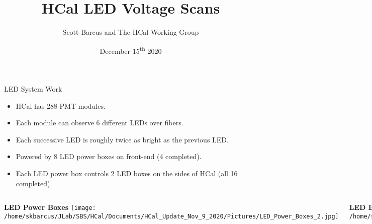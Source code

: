 \documentclass[10pt]{beamer}
\title{HCal LED Voltage Scans}
\subtitle{}
\date{December 15\textsuperscript{th} 2020}
\author{Scott Barcus and The HCal Working Group}
\institute{Jefferson Lab}
\begin{document}
\maketitle

\begin{frame}{LED System Work}

    \begin{itemize}
		\item HCal has 288 PMT modules. 
		\item Each module can observe 6 different LEDs over fibers.
		\item Each successive LED is roughly twice as bright as the previous LED.
        \item Powered by 8 LED power boxes on front-end (4 completed).
        \item Each LED power box controls 2 LED boxes on the sides of HCal (all 16 completed).
    \end{itemize}
    
    \begin{columns}[T,onlytextwidth]
	
	\vspace{-3mm}
	\begin{center}
	    \textbf{LED Power Boxes}
	    \texttt{[image: /home/skbarcus/JLab/SBS/HCal/Documents/HCal\_Update\_Nov\_9\_2020/Pictures/LED\_Power\_Boxes\_2.jpg]}
  	\end{center}
	
	
	\vspace{-3mm}
	\begin{center}
		\textbf{LED Boxes}
		\texttt{[image: /home/skbarcus/JLab/SBS/HCal/Documents/HCal\_Update\_Nov\_9\_2020/Pictures/LED\_Boxes.jpg]}
  	\end{center}
	
	\end{columns}

\end{frame}
\end{document}
